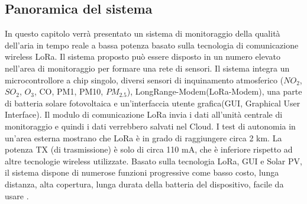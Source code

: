 \documentclass[a4paper]{report} %
\begin{document}
\subsection{Panoramica del sistema}
In questo capitolo verrà presentato un sistema di monitoraggio della qualità dell'aria in tempo reale a bassa potenza basato sulla tecnologia di comunicazione wireless LoRa. Il sistema proposto può essere disposto in un numero elevato nell'area di monitoraggio per formare una rete di sensori. Il sistema integra un microcontrollore a chip singolo, diversi sensori di inquinamento atmosferico ($ NO_{2} $, $ SO_{2} $, $ O_{3} $, CO, PM1, PM10, $ PM_{2.5} $), LongRange-Modem(LoRa-Modem), una parte di batteria solare fotovoltaica e un'interfaccia utente grafica(GUI, Graphical User Interface). Il modulo di comunicazione LoRa invia i dati all'unità centrale di monitoraggio e quindi i dati verrebbero salvati nel Cloud. I test di autonomia in un'area esterna mostrano che LoRa è in grado di raggiungere circa 2 km. La potenza TX (di trasmissione) è solo di circa 110 mA, che è inferiore rispetto ad altre tecnologie wireless utilizzate. Basato sulla tecnologia LoRa, GUI e Solar PV, il sistema dispone di numerose funzioni progressive come basso costo, lunga distanza, alta copertura, lunga durata della batteria del dispositivo, facile da usare \cite{art:rif.40}. 
\end{document}
